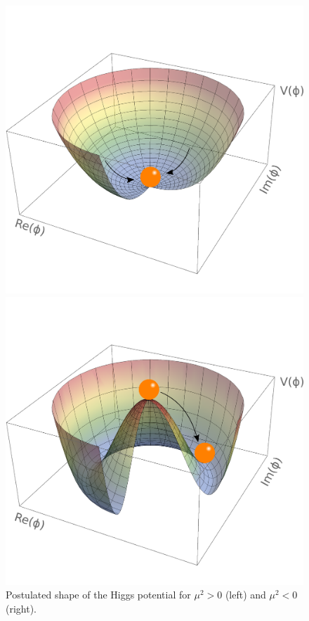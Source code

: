 \begin{figure}
	\centering
	\begin{minipage}{.5\textwidth}
		\centering
		\includegraphics[trim={0cm 1cm 0cm 2cm},clip,width=\linewidth]{./Figures/HiggsV_noEWSB.png}
	\end{minipage}%
	\begin{minipage}{.5\textwidth}
		\centering
		\includegraphics[trim={0cm 1cm 0cm 2cm},clip,width=\linewidth]{./Figures/HiggsV_EWSB.png}
	\end{minipage}
	\label{fig:higgsV}
	\caption{Postulated shape of the Higgs potential for $\mu^2>0$ (left) and $\mu^2<0$ (right).}
\end{figure}

